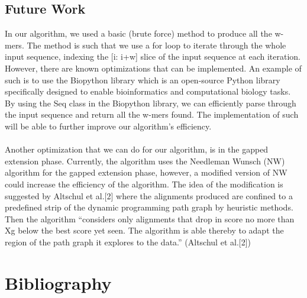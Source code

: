 \documentclass{article}
\begin{document}
\subsection*{Future Work}
In our algorithm, we used a basic (brute force) method to produce all the w-mers. The method is such that we use a for loop to iterate through the whole input sequence, indexing the [i: i+w] slice of the input sequence at each iteration. However, there are known optimizations that can be implemented. An example of such is to use the Biopython library which is an open-source Python library specifically designed to enable bioinformatics and computational biology tasks. By using the Seq class in the Biopython library, we can efficiently parse through the input sequence and return all the w-mers found. The implementation of such will be able to further improve our algorithm’s efficiency.\\
\\
Another optimization that we can do for our algorithm, is in the gapped extension phase. Currently, the algorithm uses the Needleman Wunsch (NW) algorithm for the gapped extension phase, however, a modified version of NW could increase the efficiency of the algorithm. The idea of the modification is suggested by Altschul et al.[2] where the alignments produced are confined to a predefined strip of the dynamic programming path graph by heuristic methods. Then the algorithm “considers only alignments that drop in score no more than Xg below the best score yet seen. The algorithm is able thereby to adapt the region of the path graph it explores to the data.” (Altschul et al.[2]) \\

\section*{Bibliography}
\end{document}
